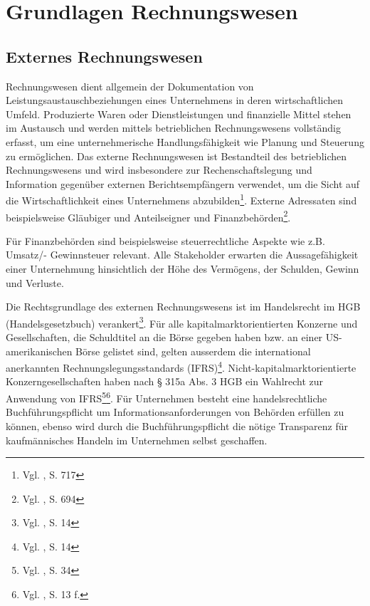 \section{Grundlagen Rechnungswesen}

\subsection{Externes Rechnungswesen}
\label{ssec:externesRechnungswesen}
Rechnungswesen dient allgemein der Dokumentation von Leistungsaustauschbeziehungen eines Unternehmens in deren wirtschaftlichen Umfeld. Produzierte Waren oder Dienstleistungen und finanzielle Mittel stehen im Austausch und werden mittels betrieblichen Rechnungswesens vollständig erfasst, um eine unternehmerische Handlungsfähigkeit wie Planung und Steuerung zu ermöglichen. Das externe Rechnungswesen ist Bestandteil des betrieblichen Rechnungswesens und wird insbesondere zur Rechenschaftslegung und Information gegenüber externen Berichtsempfängern verwendet, um die Sicht auf die Wirtschaftlichkeit eines Unternehmens abzubilden\footnote{Vgl. \cite{Wohe2000}, S. 717}. Externe Adressaten sind beispielsweise Gläubiger und Anteilseigner und Finanzbehörden\footnote{Vgl. \cite{Wohe2000}, S. 694}.

Für Finanzbehörden sind beispielsweise steuerrechtliche Aspekte wie z.B. Umsatz/- Gewinnsteuer relevant. Alle Stakeholder erwarten die Aussagefähigkeit einer Unternehmung hinsichtlich der Höhe des Vermögens, der Schulden, Gewinn und Verluste. 

Die Rechtsgrundlage des externen Rechnungswesens ist im Handelsrecht im  HGB (Handelsgesetzbuch) verankert\footnote{Vgl. \cite{Woltje2008}, S. 14}. Für alle kapitalmarktorientierten Konzerne und Gesellschaften, die Schuldtitel an die Börse gegeben haben bzw. an einer US-amerikanischen Börse gelistet sind, gelten ausserdem die international anerkannten Rechnungslegungsstandards (IFRS)\footnote{Vgl. \cite{Klein2010}, S. 14}. Nicht-kapitalmarktorientierte Konzerngesellschaften haben nach § 315a Abs. 3 HGB ein Wahlrecht zur Anwendung von IFRS\footnote{Vgl. \cite{Funk2008}, S. 34}\footnote{Vgl. \cite{Oehler2005}, S. 13 f.}.
Für Unternehmen besteht eine handelsrechtliche \\Buchführungspflicht um Informationsanforderungen von Behörden erfüllen zu können, ebenso wird durch die Buchführungspflicht die nötige Transparenz für kaufmännisches Handeln im Unternehmen selbst geschaffen.

